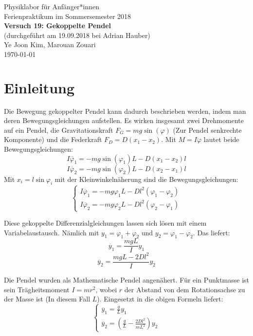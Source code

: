 \documentclass[11pt,a4paper]{article}
\begin{document}
{
	\centering 
	\large 
	Physiklabor für Anfänger*innen \\
	Ferienpraktikum im Sommersemester 2018 \\[4mm]
	\textbf{\LARGE 
		Versuch 19: Gekoppelte Pendel
	} \\[3mm]
	(durchgeführt am 19.09.2018 bei Adrian Hauber) \\
	Ye Joon Kim, Marouan Zouari\\
	\today \\[10mm]
}
\tableofcontents
\section{Einleitung}
Die Bewegung gekoppelter Pendel kann dadurch beschrieben werden, indem man deren Bewegungsgleichungen aufstellen. Es wirken insgesamt zwei Drehmomente auf ein Pendel, die Gravitationskraft $F_G = mg\sin(\varphi)$ (Zur Pendel senkrechte Komponente) und die Federkraft $F_D = D(x_1 - x_2)$. Mit $M = I\ddot{\varphi}$ lautet beide Bewegungsgleichungen:
$$ I \ddot{\varphi_1} = -mg\sin(\varphi_1)L - D(x_1-x_2)l$$
$$I \ddot{\varphi_2} = -mg\sin(\varphi_2)L - D(x_2-x_1)l$$
Mit $x_i = l\sin{\varphi_i}$ mit der Kleinwinkelnäherung sind die Bewegungsgleichungen:
\begin{equation}
\left\{
\begin{array}{c}
I\ddot{\varphi_1}=-mg\varphi_1L - Dl^2(\varphi_1-\varphi_2)
\\
I\ddot{\varphi_2}=-mg\varphi_2L - Dl^2(\varphi_2-\varphi_1)
\end{array}
\right.
\end{equation}

Diese gekoppelte Differenzialgleichungen lassen sich lösen mit einem Variabelaustausch. Nämlich mit $y_1 = \varphi_1 + \varphi_2$ und $y_2 = \varphi_1 - \varphi_2$. Das liefert:
$$\ddot{y_1} = \frac{mgL}{I}y_1$$
$$\ddot{y_2} = \frac{mgL-2Dl^2}{I}y_2$$

Die Pendel wurden als Mathematische Pendel angenähert. Für ein Punktmasse ist sein Trägheitsmoment $I = mr^2$, wobei $r$ der Abstand von dem Rotationsachse zu der Masse ist (In diesem Fall $L$). Eingesetzt in die obigen Formeln liefert:
\begin{equation}
\left\{
\begin{array}{c}
\ddot{y_1} = \frac{g}{L}y_1
\\
\ddot{y_2} = (\frac{g}{L}-\frac{2Dl^2}{mL^2})y_2
\end{array}
\right.
\end{equation}
\end{document}
